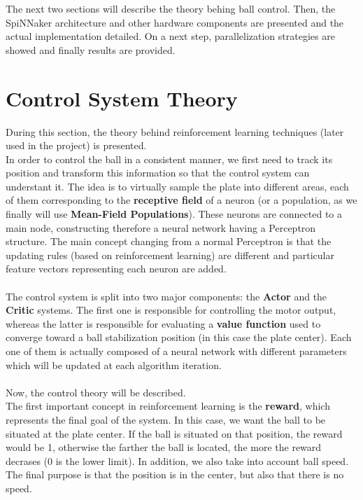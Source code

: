 \documentclass{article}
\begin{document}
The next two sections will describe the theory behing ball control. Then, the SpiNNaker architecture and other hardware components are presented and the actual implementation detailed. On a next step, parallelization strategies are showed and finally results are provided.


\section{Control System Theory}
During this section, the theory behind reinforcement learning techniques (later used in the project) is presented.\\

In order to control the ball in a consistent manner, we first need to track its position and transform this information so that the control system can understant it.
The idea is to virtually sample the plate into different areas, each of them corresponding to the \textbf{receptive field} of a neuron (or a population, as we finally will use \textbf{Mean-Field Populations}). These neurons are connected to a main node, constructing therefore a neural network having a Perceptron structure. The main concept changing from a normal Perceptron is that the updating rules (based on reinforcement learning) are different and particular feature vectors representing each neuron are added. \\ \\

The control system is split into two major components: the \textbf{Actor} and the \textbf{Critic} systems. The first one is responsible for controlling the motor output, whereas the latter is responsible for evaluating a \textbf{value function} used to converge toward a ball stabilization position (in this case the plate center). Each one of them is actually composed of a neural network with different parameters which will be updated at each algorithm iteration. \\ \\

Now, the control theory will be described. \\
The first important concept in reinforcement learning is the \textbf{reward}, which represents the final goal of the system. In this case, we want the ball to be situated at the plate center. If the ball is situated on that position, the reward would be 1, otherwise the farther the ball is located, the more the reward decrases (0 is the lower limit). In addition, we also take into account ball speed. The final purpose is that the position is in the center, but also that there is no speed. \\ \\
\end{document}

